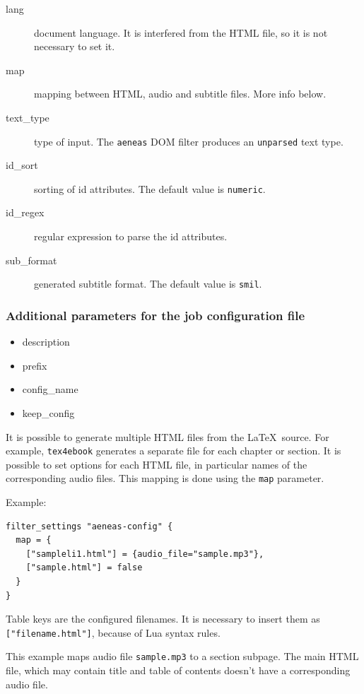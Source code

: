 \begin{description}
\item[lang]
document language. It is interfered from the HTML file, so it is not
necessary to set it.
\item[map]
mapping between HTML, audio and subtitle files. More info below.
\item[text\_type]
type of input. The \texttt{aeneas} DOM filter produces an
\texttt{unparsed} text type.
\item[id\_sort]
sorting of id attributes. The default value is \texttt{numeric}.
\item[id\_regex]
regular expression to parse the id attributes.
\item[sub\_format]
generated subtitle format. The default value is \texttt{smil}.
\end{description}

\subsubsection{Additional parameters for the job configuration
file}\label{additional-parameters-for-the-job-configuration-file}

\begin{itemize}
\tightlist
\item
  description
\item
  prefix
\item
  config\_name
\item
  keep\_config
\end{itemize}

It is possible to generate multiple HTML files from the \LaTeX~source.
For example, \texttt{tex4ebook} generates a separate file for each
chapter or section. It is possible to set options for each HTML file, in
particular names of the corresponding audio files. This mapping is done
using the \texttt{map} parameter.

Example:

\begin{verbatim}
filter_settings "aeneas-config" {
  map = {
    ["sampleli1.html"] = {audio_file="sample.mp3"}, 
    ["sample.html"] = false
  }
}
\end{verbatim}

Table keys are the configured filenames. It is necessary to insert them
as \texttt{{[}"filename.html"{]}}, because of Lua syntax rules.

This example maps audio file \texttt{sample.mp3} to a section subpage.
The main HTML file, which may contain title and table of contents
doesn't have a corresponding audio file.

